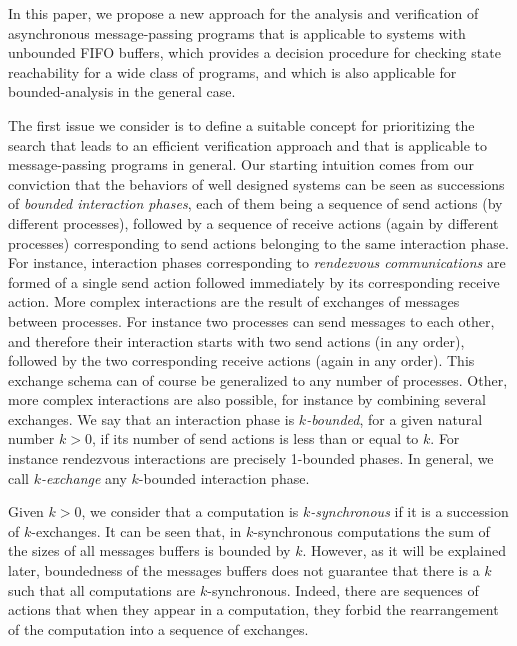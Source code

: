 In this paper, we propose a new approach for the analysis and verification of asynchronous message-passing programs that is applicable to systems with unbounded FIFO buffers, which provides a decision procedure for checking state reachability for a wide class of programs, and which is also applicable for bounded-analysis in the general case. 

The first issue we consider is to define a suitable concept for prioritizing the search that leads to an efficient verification approach and that is applicable to message-passing programs in general. Our starting intuition comes from our conviction that the behaviors of well designed systems can be seen as successions of {\em bounded interaction phases}, each of them being a sequence of send actions (by different processes), followed by a sequence of receive actions (again by different processes) corresponding to send actions belonging to the same interaction phase. For instance, interaction phases corresponding to {\em rendezvous communications} are formed of a single send action followed immediately by its corresponding receive action. More complex interactions are the result of exchanges of messages between processes. For instance two processes can send messages to each other, and therefore their interaction starts with two send actions (in any order), followed by the two corresponding receive actions (again in any order). This exchange schema can of course be generalized to any number of processes. Other, more complex interactions are also possible, for instance by combining several exchanges. We say that an interaction phase is {\em $k$-bounded}, for a given natural number $k > 0$, if its number of send actions is less than or equal to $k$. For instance rendezvous interactions are precisely 1-bounded phases.  In general, we call {\em $k$-exchange} any $k$-bounded interaction phase. 

Given $k > 0$, we consider that a computation is {\em $k$-synchronous} if it is a succession of $k$-exchanges.
It can be seen that, in $k$-synchronous computations the sum of the sizes of all messages buffers is bounded by $k$. However, as it will be explained later, boundedness of the messages buffers does not guarantee that there is a $k$ such that all computations are $k$-synchronous. Indeed, there are sequences of actions that when they appear in a computation, they forbid the rearrangement of the computation into a sequence of exchanges.  

